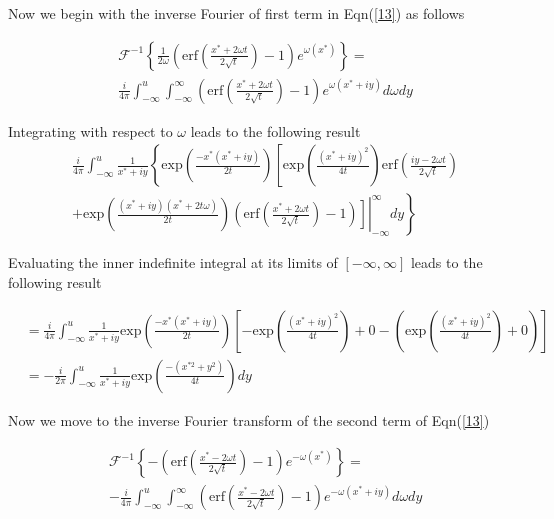 \documentclass[10pt,a4,fleqn]{article}
\begin{document}
Now we begin with the inverse Fourier of first term in Eqn(\ref{13}) as follows

\begin{equation}
\begin{split}
   &\mathcal{F}^{-1} \left\{ \frac{1}{2\omega}\left(\mathrm{erf}\left(\frac{x^* + 2\omega t}{2\sqrt{t}}\right) - 1\right ) e^{\omega\left(x^*\right)} \right\} =\\ &\frac{i}{4\pi}\int_{-\infty}^u\int_{-\infty}^{\infty} \left(\mathrm{erf}\left(\frac{x^* + 2\omega t}{2\sqrt{t}}\right) - 1\right ) e^{\omega\left(x^*+iy\right)}
   d\omega dy
   \end{split}
\end{equation}

Integrating with respect to $\omega$ leads to the following result
\begin{equation}
\begin{split}
 &\frac{i}{4\pi}\int_{-\infty}^u \frac{1}{x^* + iy} \left\{ 
   \mathrm{exp}\left(\frac{-x^*(x^*+iy)}{2t}\right) \left[
   \mathrm{exp}\left(\frac{(x^*+iy)^2}{4t}\right) \mathrm{erf}\left( \frac{iy-2\omega t}{2\sqrt{t}}\right) \right. \right.\\
    &\left.+\left. \mathrm{exp}\left(\frac{(x^*+iy)(x^*+2t\omega)}{2t}\right)\left(\mathrm{erf}\left.\left(\frac{x^*+2\omega t}{2\sqrt{t}}\right)-1\right) \right]
    \right\vert_{-\infty}^{\infty} dy\right\}
   \end{split}
\end{equation}

Evaluating the inner indefinite integral at its limits of $\left[-\infty, \infty\right]$ leads to the following result

\begin{equation}\label{part1}
\begin{aligned}
   &=\frac{i}{4\pi}\int_{-\infty}^u \frac{1}{x^* + iy} \mathrm{exp}\left(\frac{-x^*(x^*+iy)}{2t}\right) \left[ - \mathrm{exp}\left(\frac{\left(x^*+iy\right)^2}{4t}\right) + 0 - \left( \mathrm{exp}\left(\frac{\left(x^*+iy\right)^2}{4t}\right) + 0\right)\right]\\
   &=-\frac{i}{2\pi}\int_{-\infty}^u \frac{1}{x^*+iy} \mathrm{exp}\left(\frac{-\left(x^{*2}+ y^2\right)}{4t}\right) dy 
\end{aligned}
\end{equation}


Now we move to the inverse Fourier transform of the second term of Eqn(\ref{13})

\begin{equation}
\begin{split}
   &\mathcal{F}^{-1} \left\{ -\left(\mathrm{erf}\left(\frac{x^* - 2\omega t}{2\sqrt{t}}\right) - 1\right ) e^{-\omega\left(x^*\right)} \right\} 
   = \\ &-\frac{i}{4\pi}\int_{-\infty}^u\int_{-\infty}^{\infty} \left(\mathrm{erf}\left(\frac{x^* - 2\omega t}{2\sqrt{t}}\right) - 1\right ) e^{-\omega\left(x^* + iy\right)}
   d\omega dy
   \end{split}
\end{equation}
\end{document}
